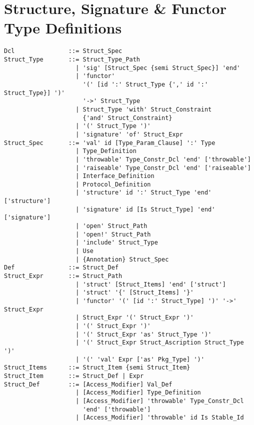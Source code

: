 \section{Structure, Signature \& Functor Type Definitions}
\label{sec:struct-types}

\syntax\begin{lstlisting}
Dcl               ::= Struct_Spec
Struct_Type       ::= Struct_Type_Path
                    | 'sig' [Struct_Spec {semi Struct_Spec}] 'end'
                    | 'functor' 
                      '(' [id ':' Struct_Type {',' id ':' Struct_Type}] ')' 
                      '->' Struct_Type
                    | Struct_Type 'with' Struct_Constraint 
                      {'and' Struct_Constraint}
                    | '(' Struct_Type ')'
                    | 'signature' 'of' Struct_Expr
Struct_Spec       ::= 'val' id [Type_Param_Clause] ':' Type
                    | Type_Definition
                    | 'throwable' Type_Constr_Dcl 'end' ['throwable']
                    | 'raiseable' Type_Constr_Dcl 'end' ['raiseable']
                    | Interface_Definition
                    | Protocol_Definition
                    | 'structure' id ':' Struct_Type 'end' ['structure']
                    | 'signature' id [Is Struct_Type] 'end' ['signature']
                    | 'open' Struct_Path
                    | 'open!' Struct_Path
                    | 'include' Struct_Type
                    | Use
                    | {Annotation} Struct_Spec
Def               ::= Struct_Def
Struct_Expr       ::= Struct_Path
                    | 'struct' [Struct_Items] 'end' ['struct']
                    | 'struct' '{' [Struct_Items] '}'
                    | 'functor' '(' [id ':' Struct_Type] ')' '->' Struct_Expr
                    | Struct_Expr '(' Struct_Expr ')'
                    | '(' Struct_Expr ')'
                    | '(' Struct_Expr 'as' Struct_Type ')'
                    | '(' Struct_Expr Struct_Ascription Struct_Type ')'
                    | '(' 'val' Expr ['as' Pkg_Type] ')'
Struct_Items      ::= Struct_Item {semi Struct_Item} 
Struct_Item       ::= Struct_Def | Expr
Struct_Def        ::= [Access_Modifier] Val_Def
                    | [Access_Modifier] Type_Definition
                    | [Access_Modifier] 'throwable' Type_Constr_Dcl 
                      'end' ['throwable']
                    | [Access_Modifier] 'throwable' id Is Stable_Id

\end{lstlisting}
